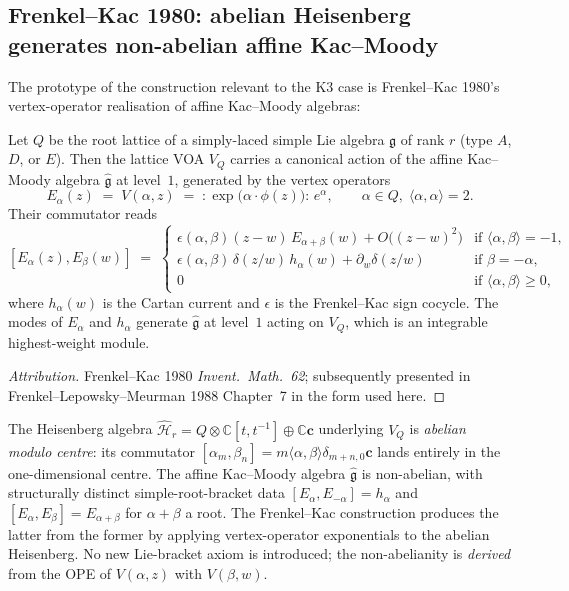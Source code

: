\subsection{Frenkel--Kac 1980: abelian Heisenberg generates non-abelian affine Kac--Moody}
\label{subsec:frenkel-kac-1980}

The prototype of the construction relevant to the K3 case is Frenkel--Kac
1980's vertex-operator realisation of affine Kac--Moody algebras:

\begin{theorem}
\label{thm:frenkel-kac-1980}
Let $Q$ be the root lattice of a simply-laced simple Lie algebra
$\mathfrak{g}$ of rank $r$ (type $A$, $D$, or $E$). Then the lattice VOA
$V_Q$ carries a canonical action of the affine Kac--Moody algebra
$\widehat{\mathfrak{g}}$ at level~$1$, generated by the vertex operators
\[
 E_\alpha(z)
 \;=\;
 V(\alpha, z)
 \;=\;
 {:}\exp\!\bigl(\alpha\cdot\phi(z)\bigr){:}\,e^\alpha,
 \qquad
 \alpha\in Q,\;\langle\alpha,\alpha\rangle = 2.
\]
Their commutator reads
\begin{equation}
\label{eq:fk-commutator}
 [E_\alpha(z),E_\beta(w)]
 \;=\;
 \begin{cases}
 \epsilon(\alpha,\beta)(z-w)\,E_{\alpha+\beta}(w) + O\bigl((z-w)^2\bigr) & \text{if }\langle\alpha,\beta\rangle = -1,\\[2pt]
 \epsilon(\alpha,\beta)\,\delta(z/w)\,h_\alpha(w) + \partial_w\delta(z/w) & \text{if }\beta = -\alpha,\\[2pt]
 0 & \text{if }\langle\alpha,\beta\rangle \geq 0,
 \end{cases}
\end{equation}
where $h_\alpha(w)$ is the Cartan current and $\epsilon$ is the Frenkel--Kac
sign cocycle. The modes of $E_\alpha$ and $h_\alpha$ generate
$\widehat{\mathfrak{g}}$ at level~$1$ acting on $V_Q$, which is an integrable
highest-weight module.
\end{theorem}

\begin{proof}[Attribution]
Frenkel--Kac 1980 \emph{Invent.\ Math.\ 62}; subsequently presented in
Frenkel--Lepowsky--Meurman 1988 Chapter~7 in the form used here.
\end{proof}

\begin{remark}
\label{rem:fk-abelian-in-nonabelian-out}
The Heisenberg algebra $\widehat{\mathcal{H}}_r = Q\otimes\mathbb{C}[t,t^{-1}]
\oplus\mathbb{C}\mathbf{c}$ underlying $V_Q$ is \emph{abelian modulo centre}:
its commutator $[\alpha_m,\beta_n] = m\langle\alpha,\beta\rangle\delta_{m+n,0}
\mathbf{c}$ lands entirely in the one-dimensional centre. The affine
Kac--Moody algebra $\widehat{\mathfrak{g}}$ is non-abelian, with
structurally distinct simple-root-bracket data
$[E_\alpha,E_{-\alpha}] = h_\alpha$ and $[E_\alpha,E_\beta] =
E_{\alpha+\beta}$ for $\alpha+\beta$ a root. The Frenkel--Kac construction
produces the latter from the former by applying vertex-operator
exponentials to the abelian Heisenberg. No new Lie-bracket axiom is
introduced; the non-abelianity is \emph{derived} from the OPE of
$V(\alpha,z)$ with $V(\beta,w)$.
\end{remark}

